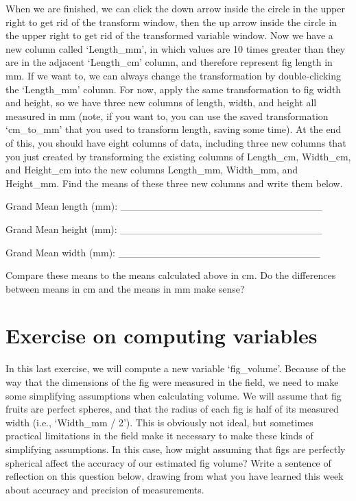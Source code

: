 \documentclass[
]{scrbook}
\begin{document}
When we are finished, we can click the down arrow inside the circle in the upper right to get rid of the transform window, then the up arrow inside the circle in the upper right to get rid of the transformed variable window.
Now we have a new column called `Length\_mm', in which values are 10 times greater than they are in the adjacent `Length\_cm' column, and therefore represent fig length in mm.
If we want to, we can always change the transformation by double-clicking the `Length\_mm' column.
For now, apply the same transformation to fig width and height, so we have three new columns of length, width, and height all measured in mm (note, if you want to, you can use the saved transformation `cm\_to\_mm' that you used to transform length, saving some time).
At the end of this, you should have eight columns of data, including three new columns that you just created by transforming the existing columns of Length\_cm, Width\_cm, and Height\_cm into the new columns Length\_mm, Width\_mm, and Height\_mm.
Find the means of these three new columns and write them below.

Grand Mean length (mm): \_\_\_\_\_\_\_\_\_\_\_\_\_\_\_\_\_\_\_\_\_\_\_\_\_\_\_\_

Grand Mean height (mm): \_\_\_\_\_\_\_\_\_\_\_\_\_\_\_\_\_\_\_\_\_\_\_\_\_\_\_\_

Grand Mean width (mm): \_\_\_\_\_\_\_\_\_\_\_\_\_\_\_\_\_\_\_\_\_\_\_\_\_\_\_\_

Compare these means to the means calculated above in cm.
Do the differences between means in cm and the means in mm make sense?

\hypertarget{computing_variables_02}{%
\section{Exercise on computing variables}\label{computing_variables_02}}

In this last exercise, we will compute a new variable `fig\_volume'.
Because of the way that the dimensions of the fig were measured in the field, we need to make some simplifying assumptions when calculating volume.
We will assume that fig fruits are perfect spheres, and that the radius of each fig is half of its measured width (i.e., `Width\_mm / 2').
This is obviously not ideal, but sometimes practical limitations in the field make it necessary to make these kinds of simplifying assumptions.
In this case, how might assuming that figs are perfectly spherical affect the accuracy of our estimated fig volume?
Write a sentence of reflection on this question below, drawing from what you have learned this week about accuracy and precision of measurements.
\end{document}

